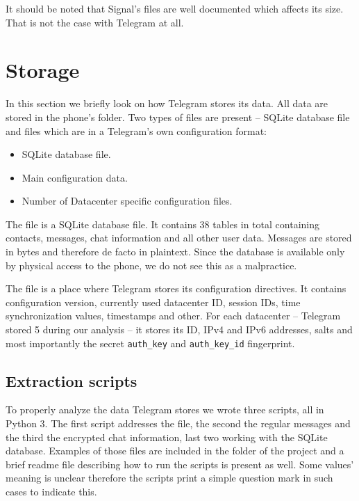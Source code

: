 \documentclass[thesis=M,english]{FITthesis}[2012/10/20]
\begin{document}
It should be noted that Signal's files are well documented which affects its size. That is not the case with Telegram at all.

\section{Storage}\label{analysis-storage}

In this section we briefly look on how Telegram stores its data. All data are stored in the phone's  folder. Two types of files are present -- SQLite database file and  files which are in a Telegram's own configuration format:

\begin{itemize}
	\item {} SQLite database file.
	\item {} Main configuration data.
	\item {} Number of Datacenter specific configuration files.
\end{itemize}

The  file is a SQLite database file. It contains 38 tables in total containing contacts, messages, chat information and all other user data. Messages are stored in bytes and therefore de facto in plaintext. Since the database is available only by physical access to the phone, we do not see this as a malpractice.

The  file is a place where Telegram stores its configuration directives. It contains configuration version, currently used datacenter ID, session IDs, time synchronization values, timestamps and other. For each datacenter -- Telegram stored 5 during our analysis -- it stores its ID, IPv4 and IPv6 addresses, salts and most importantly the secret \texttt{auth\_key} and \texttt{auth\_key\_id} fingerprint.

\subsection{Extraction scripts}\label{analysis-storage-scripts}

To properly analyze the data Telegram stores we wrote three scripts, all in Python 3. The first script addresses the  file, the second the regular messages and the third the encrypted chat information, last two working with the SQLite database. Examples of those files are included in the  folder of the project and a brief readme file describing how to run the scripts is present as well. Some values' meaning is unclear therefore the scripts print a simple question mark in such cases to indicate this.
\end{document}
